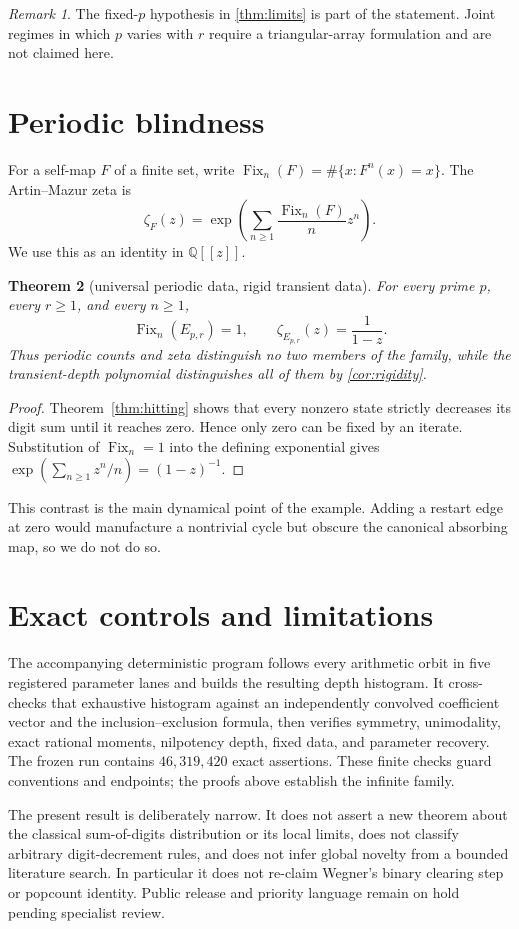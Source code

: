 \documentclass[11pt,a4paper]{amsart}
\newtheorem{theorem}{Theorem}[section]
\theoremstyle{definition}
\theoremstyle{remark}
\newtheorem{remark}[theorem]{Remark}
\newcommand{\F}{\operatorname{Fix}}
\begin{document}
\begin{remark}
The fixed-$p$ hypothesis in \cref{thm:limits} is part of the statement.
Joint regimes in which $p$ varies with $r$ require a triangular-array
formulation and are not claimed here.
\end{remark}

\section{Periodic blindness}

For a self-map $F$ of a finite set, write
$\F_n(F)=\#\{x:F^n(x)=x\}$.  The Artin--Mazur zeta is
\cite{ArtinMazur1965}
\[
 \zeta_F(z)=\exp\left(\sum_{n\geq1}\frac{\F_n(F)}n z^n\right).
\]
We use this as an identity in $\mathbb Q[[z]]$.

\begin{theorem}[universal periodic data, rigid transient data]
For every prime $p$, every $r\geq1$, and every $n\geq1$,
\[
 \F_n(E_{p,r})=1,
 \qquad
 \zeta_{E_{p,r}}(z)=\frac1{1-z}.
\]
Thus periodic counts and zeta distinguish no two members of the family,
while the transient-depth polynomial distinguishes all of them by
\cref{cor:rigidity}.
\end{theorem}

\begin{proof}
Theorem~\ref{thm:hitting} shows that every nonzero state strictly decreases
its digit sum until it reaches zero.  Hence only zero can be fixed by an
iterate.  Substitution of $\F_n=1$ into the defining exponential gives
$\exp(\sum_{n\ge1}z^n/n)=(1-z)^{-1}$.
\end{proof}

This contrast is the main dynamical point of the example.  Adding a restart
edge at zero would manufacture a nontrivial cycle but obscure the canonical
absorbing map, so we do not do so.

\section{Exact controls and limitations}

The accompanying deterministic program follows every arithmetic orbit in
five registered parameter lanes and builds the resulting depth histogram.
It cross-checks that exhaustive histogram against an independently convolved
coefficient vector and the inclusion--exclusion formula, then verifies
symmetry, unimodality, exact rational moments, nilpotency depth, fixed data,
and parameter recovery.  The frozen run contains $46{,}319{,}420$ exact
assertions.  These finite checks guard conventions and endpoints; the proofs
above establish the infinite family.

The present result is deliberately narrow.  It does not assert a new theorem
about the classical sum-of-digits distribution or its local limits, does not
classify arbitrary digit-decrement rules, and does not infer global novelty
from a bounded literature search.  In particular it does not re-claim
Wegner's binary clearing step or popcount identity.  Public release and
priority language remain on hold pending specialist review.



\end{document}
